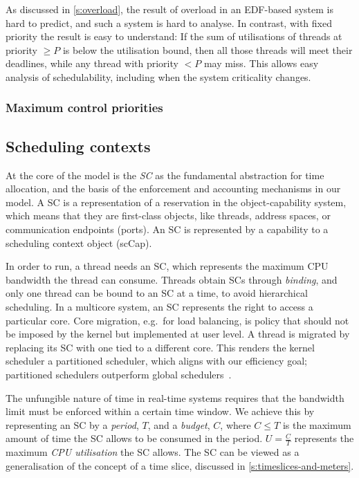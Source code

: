 As discussed in \autoref{s:overload}, the result of overload in an
EDF-based system is hard to predict, and such a system is hard to
analyse. In contrast, with fixed priority the result is easy to
understand: If the sum of utilisations of threads at priority \(\geq
P\) is below the utilisation bound, then all those threads will meet
their deadlines, while any thread with priority \(<P\) may miss. This
allows easy analysis of schedulability, including when the system
criticality changes.

\subsubsection{Maximum control priorities}
\label{sec:model-maximum-control-priorities}

\subsection{Scheduling contexts}
\label{sec:model-scheduling-contexts}

At the core of the model is the \emph{\gls{SC}} as the
fundamental abstraction for time allocation, and the basis of 
the enforcement and accounting mechanisms in our model.
A \gls{SC} is a representation
of a reservation in the object-capability system, which means that 
they are first-class objects, like threads, address spaces, or
communication endpoints (ports). An SC is represented by a capability to a
scheduling context object (scCap).

In order to run, a thread needs an \gls{SC}, which represents the
maximum CPU bandwidth the thread can consume. Threads obtain \glspl{SC} through \emph{binding}, and
only one thread can be bound to an \gls{SC} at a time, to avoid hierarchical scheduling.
In a multicore system, an SC represents the right to access a
particular core. Core migration, e.g.\ for load balancing, is policy
that should not be imposed by the kernel but implemented at user
level. A thread is migrated by replacing its SC with one tied to a
different core. This renders the kernel scheduler a partitioned scheduler, 
which aligns with our efficiency goal; partitioned schedulers outperform global
schedulers~\citep{Brandenburg:phd}.

The unfungible nature of time in real-time systems requires that the
bandwidth limit must be enforced within a certain time window. We
achieve this by representing an SC by a \emph{period}, \(T\), and a
\emph{budget}, \(C\), where \(C\leq T\) is the maximum amount of time
the SC allows to be consumed in the period. \(U=\frac{C}{T}\) represents the
maximum \emph{CPU utilisation} the SC allows. The SC can be viewed as
a generalisation of the concept of a time slice, discussed in \cref{s:timeslices-and-meters}.

